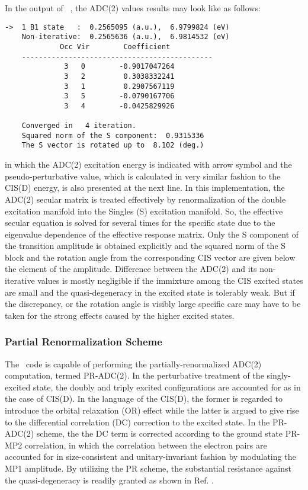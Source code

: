 In the output of \PSIadc\ , the ADC(2) values results may look like as follows:
\begin{verbatim}
->  1 B1 state   :  0.2565095 (a.u.),  6.9799824 (eV)
    Non-iterative:  0.2565636 (a.u.),  6.9814532 (eV)
             Occ Vir        Coefficient
    ---------------------------------------------
              3   0        -0.9017047264
              3   2         0.3038332241
              3   1         0.2907567119
              3   5        -0.0790167706
              3   4        -0.0425829926
              
    Converged in   4 iteration.
    Squared norm of the S component:  0.9315336
    The S vector is rotated up to  8.102 (deg.)
\end{verbatim} 
in which the ADC(2) excitation energy is indicated with arrow symbol and the pseudo-perturbative value, which is calculated in very similar fashion to the CIS(D) energy, is also presented at the next line. In this implementation, the ADC(2) secular matrix is treated effectively by renormalization of the double excitation manifold into the Singles (S) excitation manifold. So, the effective secular equation is solved for several times for the specific state due to the eigenvalue dependence of the effective response matrix. Only the S component of the transition amplitude is obtained explicitly and the squared norm of the S block and the rotation angle from the corresponding CIS vector are given below the element of the amplitude. Difference between the ADC(2) and its non-iterative values is mostly negligible if the immixture among the CIS excited states are small and the quasi-degeneracy in the excited state is tolerably weak. But if the discrepancy, or the rotation angle is visibly large specific care may have to be taken for the strong effects caused by the higher excited states. 

\subsubsection{Partial Renormalization Scheme}
The \PSIadc\ code is capable of performing the partially-renormalized ADC(2) computation, termed PR-ADC(2). In the perturbative treatment of the singly-excited state, the doubly and triply excited configurations are accounted for as in the case of CIS(D). In the language of the CIS(D), the former is regarded to introduce the orbital relaxation (OR) effect while the latter is argued to give rise to the differential correlation (DC) correction to the excited state. In the PR-ADC(2) scheme, the the DC term is corrected according to the ground state PR-MP2 correlation, in which the correlation between the electron pairs are accounted for in size-consistent and unitary-invariant fashion by modulating the MP1 amplitude. By utilizing the PR scheme, the substantial resistance against the quasi-degeneracy is readily granted as shown in Ref. \cite{Saitow:2012}.

